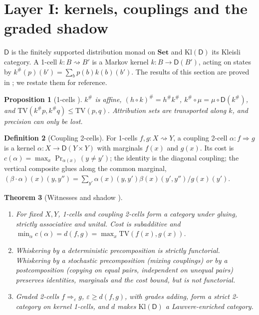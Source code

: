 \documentclass[11pt]{article}
\newtheorem{theorem}{Theorem}[section]
\newtheorem{proposition}[theorem]{Proposition}
\theoremstyle{definition}
\newtheorem{definition}[theorem]{Definition}
\theoremstyle{remark}
\newcommand{\D}{\mathsf{D}}
\newcommand{\Kl}{\mathrm{Kl}}
\newcommand{\TV}{\mathrm{TV}}
\begin{document}
\section{Layer I: kernels, couplings and the graded shadow}\label{sec:base}

$\D$ is the finitely supported distribution monad on $\mathbf{Set}$ and $\Kl(\D)$ its Kleisli category.
A 1-cell $k\colon B\rightsquigarrow B'$ is a Markov kernel $k\colon B\to\D(B')$, acting on states by
$k^\#(p)(b')=\sum_bp(b)k(b)(b')$. The results of this section are proved in
\cite[\S7]{Awasthi-Attribution}; we restate them for reference.

\begin{proposition}[1-cells {\cite[Props.~7.2, 7.3]{Awasthi-Attribution}}]\label{prop:1cells}
$k^\#$ is affine, $(h\circ k)^\#=h^\#k^\#$, $k^\#\circ\mu=\mu\circ\D(k^\#)$, and
$\TV(k^\#p,k^\#q)\le\TV(p,q)$. Attribution sets are transported along $k$, and precision can only be lost.
\end{proposition}

\begin{definition}[Coupling 2-cells]\label{def:coupling}
For 1-cells $f,g\colon X\rightsquigarrow Y$, a coupling 2-cell $\alpha\colon f\Rightarrow g$ is a kernel
$\alpha\colon X\to\D(Y\times Y)$ with marginals $f(x)$ and $g(x)$. Its cost is
$c(\alpha)=\max_x\Pr_{\alpha(x)}(y\ne y')$; the identity is the diagonal coupling; the vertical
composite glues along the common marginal,
$(\beta\cdot\alpha)(x)(y,y'')=\sum_{y'}\alpha(x)(y,y')\beta(x)(y',y'')/g(x)(y')$.
\end{definition}

\begin{theorem}[Witnesses and shadow {\cite[Thms.~7.6, 7.8]{Awasthi-Attribution}}]\label{thm:witness}
\leavevmode
\begin{enumerate}[label=(\roman*)]
\item For fixed $X,Y$, 1-cells and coupling 2-cells form a category under gluing, strictly
  associative and unital. Cost is subadditive and $\min_\alpha c(\alpha)=d(f,g)=\max_x\TV(f(x),g(x))$.
\item Whiskering by a deterministic precomposition is strictly functorial. Whiskering by a stochastic
  precomposition (mixing couplings) or by a postcomposition (copying on equal pairs, independent on
  unequal pairs) preserves identities, marginals and the cost bound, but is not functorial.
\item Graded 2-cells $f\Rightarrow_\varepsilon g$, $\varepsilon\ge d(f,g)$, with grades adding, form a strict
  2-category on kernel 1-cells, and $d$ makes $\Kl(\D)$ a Lawvere-enriched category.
\end{enumerate}
\end{theorem}
\end{document}

